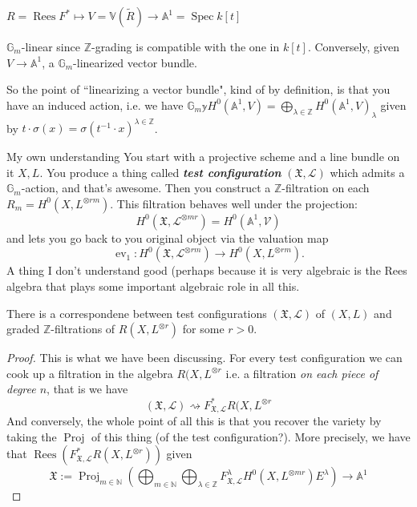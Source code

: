 \(R=\operatorname{ R e e s}F^* \mapsto  V= \mathbb{V}(\tilde{R}) \to \mathbb{A}^1=\operatorname{Spec}k[t]\)

\(\mathbb{G}_m\)-linear since \(\mathbb{Z}\)-grading is compatible with the one in \(k[t]\). Conversely, given  \(V \to \mathbb{A}^1\), a \(\mathbb{G}_m\)-linearized vector bundle.

So the point of ``linearizing a vector bundle", kind of by definition, is that you have an induced action, i.e. we have \(\mathbb{G}_m \mathbb{y} H^{0}(\mathbb{A}^1,V)=\bigoplus_{\lambda \in \mathbb{Z}}H^{0}(\mathbb{A}^1,V)_\lambda\) given by \(t \cdot \sigma(x)=\sigma(t^{-1}\cdot x)^{\lambda \in \mathbb{Z}}\).


\begin{thing7}{My own understanding}\leavevmode
You start with a projective scheme and a line bundle on it \(X,L\). You produce a thing called \textit{\textbf{test configuration}} \((\mathfrak{X},\mathcal{L})\) which admits a \(\mathbb{G}_m\)-action, and that's awesome. Then you construct a  \(\mathbb{Z}\)-filtration on each \(R_m=H^{0}(X,L^{\otimes rm})\). This filtration behaves well under the projection:
\[H^{0}(\mathfrak{X},\mathcal{L}^{\otimes mr})=H^{0}(\mathbb{A}^1, \mathcal{V})\]
and lets you go back to you original object via the valuation map
\[\operatorname{ev}_1:H^{0}(\mathfrak{X},\mathcal{ L}^{\otimes rm}) \to H^{0}(X, L^{ \otimes r m }).\]
A thing I don't understand good (perhaps because it is very algebraic is the Rees algebra that plays some important algebraic role in all this.
\end{thing7}

\begin{thm}\leavevmode
There is a correspondene between test configurations \((\mathfrak{X},\mathcal{ L})\) of \((X,L)\) and graded \(\mathbb{Z}\)-filtrations of \(R(X,L^{\otimes r})\) for some \(r>0\).
\end{thm}

\begin{proof}\leavevmode
This is what we have been discussing. For every test configuration we can cook up a filtration in the algebra \(R(X,L^{ \otimes r}\) i.e. a filtration \textit{on each piece of degree \(n\)}, that is we have
\[(\mathfrak{X},\mathcal{L}) \rightsquigarrow F^*_{\mathfrak{X},\mathcal{L}}R(X,L^{\otimes r }\]
And conversely, the whole point of all this is that you recover the variety by taking the \(\operatorname{Proj}\) of this thing (of the test configuration?). More precisely, we have that \(\operatorname{ R e e s}(F^*_{\mathfrak{X},\mathcal{L}}R(X,L^{\otimes r }))\) given
\[\mathfrak{X}:=\operatorname{Proj}_{m \in \mathbb{N}}\left(\bigoplus_{m \in \mathbb{N}} \bigoplus_{\lambda \in \mathbb{Z}}F^\lambda_{\mathfrak{X},\mathcal{L}}H^{0}(X,L^{\otimes m r })E^\lambda\right) \to \mathbb{A}^1\]
\end{proof}


